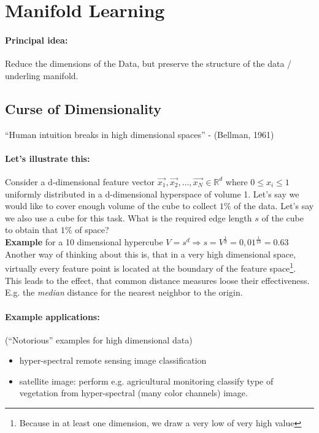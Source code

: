 
\section*{Manifold Learning}
\paragraph{Principal idea:} Reduce the dimensions of the Data, but preserve the structure of the data / underling manifold.

\subsection*{Curse of Dimensionality}
``Human intuition breaks in high dimensional spaces'' - (Bellman, 1961)

\paragraph{Let's illustrate this:}
Consider a d-dimensional feature vector $\vec{x_1}, \vec{x_2}, \dots, \vec{x_N} \in \mathbb{R}^d$ where $0 \le x_i \le 1$ uniformly distributed in a d-dimensional hyperspace of volume 1.
Let's say we would like to cover enough volume of  the cube to collect $1\%$ of the data. Let's say we also use a cube for this task. What is the required edge length $s$ of the cube to obtain that $1\%$ of space?\\

\textbf{Example} for a 10 dimensional hypercube $V=s^d \Rightarrow s = V^{\frac{1}{d}} = 0,01^{\frac{1}{10}} = 0.63$\\

Another way of thinking about this is, that in a very high dimensional space, virtually every feature point is located at the boundary of the feature space\footnote{Because in at least one dimension, we draw a very low of very high value}. This leads to the effect, that common distance measures loose their effectiveness. E.g. the \textit{median} distance for the nearest neighbor to the origin.

\paragraph{Example applications:}
(``Notorious'' examples for high dimensional data)

\begin{itemize}
    \item hyper-spectral remote sensing image classification
    \item satellite image:  perform e.g. agricultural monitoring classify type of vegetation from hyper-spectral (many color channels) image.
\end{itemize}

